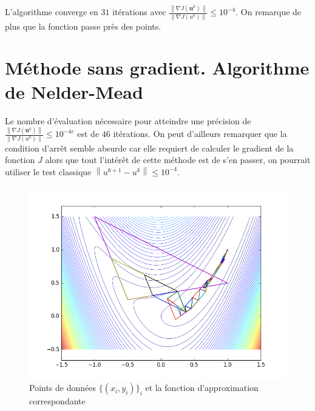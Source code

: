 \documentclass[paper=a4, fontsize=11pt]{article}
\begin{document}
L'algorithme converge en $31$ itérations avec $\frac{\left\|\nabla J(\textbf{u}^k)\right\|}{\left\|\nabla J(u^0)\right\|} \leq 10^{-4}$. On remarque de plus que la fonction passe près des points. 

\section{Méthode sans gradient. Algorithme de Nelder-Mead}
Le nombre d'évaluation nécessaire pour atteindre une précision de $\frac{\left\|\nabla J(\textbf{u}^k)\right\|}{\left\|\nabla J(u^0)\right\|} \leq 10^{-4e}$ est de $46$ itérations. On peut d'ailleurs remarquer que la condition d'arrêt semble absurde car elle requiert de calculer le gradient de la fonction $J$ alors que tout l'intérêt de cette méthode est de s'en passer, on pourrait utiliser le test classique $\left\| u^{k+1}-u^k\right\| \leq 10^{-4}$.

\begin{figure}[h]
 	\begin{center}
   \includegraphics[scale=0.6]{nelder-mead}
   \end{center}
   \caption{\label{étiquette} Points de données $\lbrace(x_i,y_i)\rbrace_i$ et la fonction d'approximation correspondante}
\end{figure}
\end{document}

